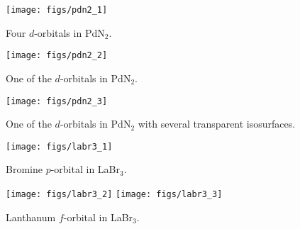 \documentclass[
  notitlepage,
  twoside,
   prb,
  floatfix,
]{revtex4-1}
\begin{document}
\newpage
 \begin{figure}
 \texttt{[image: figs/pdn2\_1]}
 \caption{Four $d$-orbitals in PdN$_2$.}
 \label{apa1}
\end{figure}

 \begin{figure}
  \texttt{[image: figs/pdn2\_2]}
  \caption{One of the $d$-orbitals in PdN$_2$.}
  \label{apa2}
 \end{figure}

 \begin{figure}
  \texttt{[image: figs/pdn2\_3]}
  \caption{One of the $d$-orbitals in PdN$_2$ with several transparent isosurfaces.}
  \label{apa3}
 \end{figure}

 \begin{figure}
  \texttt{[image: figs/labr3\_1]}
  \caption{Bromine $p$-orbital in LaBr$_3$.}
  \label{apa4}
 \end{figure}

 \begin{figure}
  \texttt{[image: figs/labr3\_2]}
  \texttt{[image: figs/labr3\_3]}
  \caption{Lanthanum $f$-orbital in LaBr$_3$.}
  \label{apa5}
 \end{figure}
\end{document}
